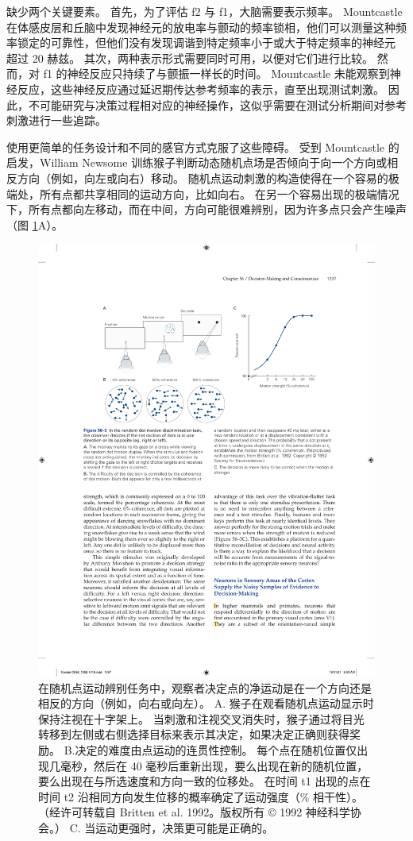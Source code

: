 缺少两个关键要素。
首先，为了评估 f2 与 f1，大脑需要表示频率。
Mountcastle 在体感皮层和丘脑中发现神经元的放电率与颤动的频率锁相，他们可以测量这种频率锁定的可靠性，但他们没有发现调谐到特定频率小于或大于特定频率的神经元 超过 20 赫兹。
其次，两种表示形式需要同时可用，以便对它们进行比较。
然而，对 f1 的神经反应只持续了与颤振一样长的时间。
Mountcastle 未能观察到神经反应，这些神经反应通过延迟期传达参考频率的表示，直至出现测试刺激。
因此，不可能研究与决策过程相对应的神经操作，这似乎需要在测试分析期间对参考刺激进行一些追踪。


使用更简单的任务设计和不同的感官方式克服了这些障碍。
受到 Mountcastle 的启发，William Newsome 训练猴子判断动态随机点场是否倾向于向一个方向或相反方向（例如，向左或向右）移动。
随机点运动刺激的构造使得在一个容易的极端处，所有点都共享相同的运动方向，比如向右。
在另一个容易出现的极端情况下，所有点都向左移动，而在中间，方向可能很难辨别，因为许多点只会产生噪声（图 \ref{fig:56_3}A）。


\begin{figure}[htbp]
	\centering
	\includegraphics[width=0.7\linewidth]{chap56/fig_56_3}
	\caption{在随机点运动辨别任务中，观察者决定点的净运动是在一个方向还是相反的方向（例如，向右或向左）。 A. 猴子在观看随机点运动显示时保持注视在十字架上。 当刺激和注视交叉消失时，猴子通过将目光转移到左侧或右侧选择目标来表示其决定，如果决定正确则获得奖励。 B.决定的难度由点运动的连贯性控制。 每个点在随机位置仅出现几毫秒，然后在 40 毫秒后重新出现，要么出现在新的随机位置，要么出现在与所选速度和方向一致的位移处。 在时间 t1 出现的点在时间 t2 沿相同方向发生位移的概率确定了运动强度（\% 相干性）。 （经许可转载自 Britten et al. 1992。版权所有 © 1992 神经科学协会。） C. 当运动更强时，决策更可能是正确的。}
	\label{fig:56_3}
\end{figure}


